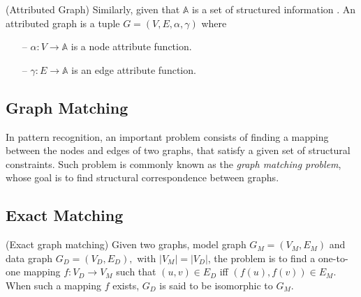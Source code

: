 \theoremstyle{definition}
\begin{definition}{(Attributed Graph)}
	Similarly, given that $\mathbb{A}$ is a set of structured information . An attributed graph is a tuple $G= (V,E,\alpha, \gamma)$ where
	\begin{itemize}
		\item[--]
		$\alpha: V \rightarrow \mathbb{A}$ is a node attribute function. 
		\item[--]
		$\gamma: E \rightarrow \mathbb{A}$ is an edge attribute function. 
	\end{itemize} 
\end{definition}


\subsection{Graph Matching}
In pattern recognition, an important problem consists of finding a mapping between the nodes and edges of two graphs, that satisfy a given set of structural constraints. Such problem is commonly known as the \textit{graph matching problem}, whose goal is to find structural correspondence between graphs. 

\subsection{Exact Matching}
\theoremstyle{definition}
\begin{definition}{(Exact graph matching)}
Given two graphs, model graph $G _{M} = (V_ {M}, E_{M})$ and data graph $G _{D} = (V_ {D}, E_{D}),$ with $|V_ {M}| = |V_ {D}|$, the problem is to find a one-to-one mapping $f : V_ {D} \rightarrow V_ {M}$ such that $(u,v) \in E_{D}$ iff $(f(u), f(v)) \in E_{M}$. When such a mapping $f$ exists, $G_D$ is said to be isomorphic to $G_M$. 
\end{definition}

